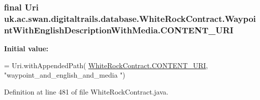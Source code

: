 \hypertarget{classuk_1_1ac_1_1swan_1_1digitaltrails_1_1database_1_1_white_rock_contract_1_1_waypoint_with_english_description_with_media_ad64a59e3c9fca4bc703fc7e865e253ec}{
\subsubsection[{C\+O\+N\+T\+E\+N\+T\+\_\+\+U\+R\+I}]{\setlength{\rightskip}{0pt plus 5cm}final Uri uk.\+ac.\+swan.\+digitaltrails.\+database.\+White\+Rock\+Contract.\+Waypoint\+With\+English\+Description\+With\+Media.\+C\+O\+N\+T\+E\+N\+T\+\_\+\+U\+R\+I\hspace{0.3cm}{\ttfamily [static]}}}\label{classuk_1_1ac_1_1swan_1_1digitaltrails_1_1database_1_1_white_rock_contract_1_1_waypoint_with_english_description_with_media_ad64a59e3c9fca4bc703fc7e865e253ec}
{\bfseries Initial value\+:}
\begin{DoxyCode}
= Uri.withAppendedPath(
                \hyperlink{classuk_1_1ac_1_1swan_1_1digitaltrails_1_1database_1_1_white_rock_contract_abfe96759bfe16773a98099536eef2306}{WhiteRockContract.CONTENT\_URI}, \textcolor{stringliteral}{"waypoint\_and\_english\_and\_media
      "})
\end{DoxyCode}


Definition at line 481 of file White\+Rock\+Contract.\+java.

